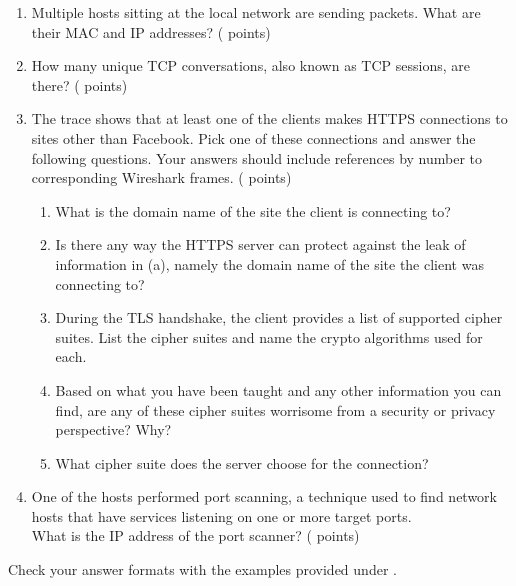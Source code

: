 \begin{enumerate}
  \item \hypertarget{cp1macip}{Multiple hosts sitting at the local network are sending packets.
	What are their MAC and IP addresses? ( points)} \label{itm:macip}

  \item \hypertarget{cp1tcp}{How many unique TCP conversations, also known as TCP sessions, are there? ( points)} \label{itm:tcp}

  \item \hypertarget{cp1ftp}{The trace shows that at least one of the clients makes HTTPS connections to sites other than Facebook.
	Pick one of these connections and answer the following questions.
	Your answers should include references by number to corresponding Wireshark frames. ( points)} \label{itm:ftp}
	
    \begin{enumerate}[label=(\alph*),nosep]
      \item What is the domain name of the site the client is connecting to?
      \item Is there any way the HTTPS server can protect against the leak of information in (a),
			namely the domain name of the site the client was connecting to?
			\item During the TLS handshake, the client provides a list of supported cipher suites.
			List the cipher suites and name the crypto algorithms used for each.
			\item Based on what you have been taught and any other information you can find,
			are any of these cipher suites worrisome from a security or privacy perspective? Why?
			\item What cipher suite does the server choose for the connection?
    \end{enumerate}

  \item \hypertarget{cp1portscan}{One of the hosts performed port scanning, a technique used to find network hosts that have services listening on one or more target ports.\\
  What is the IP address of the port scanner? ( points)} \label{itm:portscan}

\end{enumerate}

Check your answer formats with the examples provided under \textit{}.

